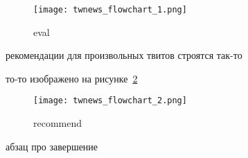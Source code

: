     \begin{figure}[h!]
            \center
            \texttt{[image: twnews\_flowchart\_1.png]}
            \caption{eval}
            \label{pic:twnews_flowchart_1}
    \end{figure}

    рекомендации для произвольных твитов строятся так-то

    то-то изображено на рисунке~\ref{pic:twnews_flowchart_2}

    \begin{figure}[h!]
            \center
            \texttt{[image: twnews\_flowchart\_2.png]}
            \caption{recommend}
            \label{pic:twnews_flowchart_2}
    \end{figure}

    абзац про завершение

    \clearpage



